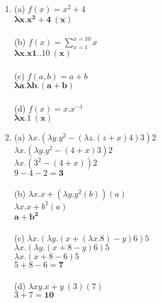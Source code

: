 \documentclass{article}
\begin{document}
\begin{enumerate}\bfseries
    \item (a) $f(x) = x^2 + 4$ \\
    $\mathbf{\lambda x.x^2 + 4\ (x)}$ \\ \\
    (b) $f(x) = \sum_{x=1}^{x=10} x$ \\
    $\mathbf{\lambda x.x{1..10}\  (x)}$ \\ \\
    (c) $f(a, b) = a + b$ \\
    $\mathbf{\lambda a.\lambda b.(a+b)}$ \\ \\
    (d) $f(x) = x.x^{-1}$ \\
    $\mathbf{\lambda x.1\ (x)}$

    \item (a) $\lambda x.(\lambda y.y^2 - (\lambda z.(z+x)4)3)2$ \\
    $\lambda x.(\lambda y.y^2 - (4+x)3)2$ \\
    $\lambda x.(3^2 - (4+x))2$ \\
    $9 - 4 - 2 = \mathbf{3}$ \\ \\
    (b) $\lambda x.x + (\lambda y.y^2(b))(a)$ \\
    $\lambda x.x + b^2 (a)$ \\
    $\mathbf{a + b^2}$ \\ \\
    (c) $\lambda x.(\lambda y.(x + (\lambda x.8) - y)6)5$ \\
    $\lambda x.(\lambda y.(x + 8 - y)6)5$ \\
    $\lambda x.(x + 8 - 6)5$ \\
    $5 + 8 - 6 = \mathbf{7}$ \\ \\
    (d) $\lambda xy.x + y\ (3)(7)$ \\
    $3 + 7 = \mathbf{10}$


\end{enumerate}
\end{document}
